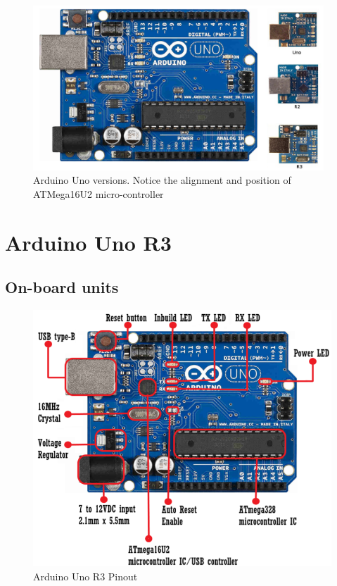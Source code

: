 \begin{figure}
    \centering
    \includegraphics[width=4.3in]{Images/Intro_Arduino/arduino_uno_versions.png}
    \caption[Arduino Uno version]{Arduino Uno versions. Notice the alignment and position of ATMega16U2 micro-controller}
\end{figure}
\newpage

\section{Arduino Uno R3}
    \subsection{On-board units}
    
    \begin{figure}
        \centering
        \includegraphics[width=\textwidth]{Images/Intro_Arduino/uno_desp.png}
        \caption{Arduino Uno R3 Pinout}
    \end{figure}
    

